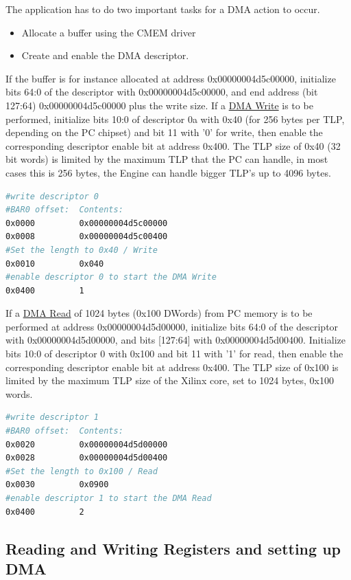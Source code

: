 The application has to do two important tasks for a DMA action to occur.
\begin{itemize}
	\item Allocate a buffer using the CMEM driver
	\item Create and enable the DMA descriptor.
\end{itemize}

If the buffer is for instance allocated at address 0x00000004d5c00000, initialize bits 64:0 of the descriptor with 0x00000004d5c00000, and end address (bit 127:64) 0x00000004d5c00000 plus the write size. If a \underline{DMA Write} is to be performed, initialize bits 10:0 of descriptor 0a with 0x40 (for 256 bytes per TLP, depending on the PC chipset) and bit 11 with '0' for write, then enable the corresponding descriptor enable bit at address 0x400. The TLP size of 0x40 (32 bit words) is limited by the maximum TLP that the PC can handle, in most cases this is 256 bytes, the Engine can handle bigger TLP's up to 4096 bytes.
\begin{lstlisting}[language=BASH, frame=single, caption=Create a Write descriptor]
#write descriptor 0
#BAR0 offset:  Contents:
0x0000         0x00000004d5c00000
0x0008         0x00000004d5c00400
#Set the length to 0x40 / Write
0x0010         0x040
#enable descriptor 0 to start the DMA Write
0x0400         1
\end{lstlisting}
If a \underline{DMA Read} of 1024 bytes (0x100 DWords) from PC memory is to be performed at address 0x00000004d5d00000, initialize bits 64:0 of the descriptor with 0x00000004d5d00000, and bits [127:64] with 0x00000004d5d00400. Initialize bits 10:0 of descriptor 0 with 0x100 and bit 11 with '1' for read, then enable the corresponding descriptor enable bit at address 0x400. The TLP size of 0x100 is limited by the maximum TLP size of the Xilinx core, set to 1024 bytes, 0x100 words.
\begin{lstlisting}[language=BASH, frame=single, caption=Create a Read descriptor]
#write descriptor 1
#BAR0 offset:  Contents:
0x0020         0x00000004d5d00000
0x0028         0x00000004d5d00400
#Set the length to 0x100 / Read
0x0030         0x0900
#enable descriptor 1 to start the DMA Read
0x0400         2
\end{lstlisting}


\subsection{Reading and Writing Registers and setting up DMA}

